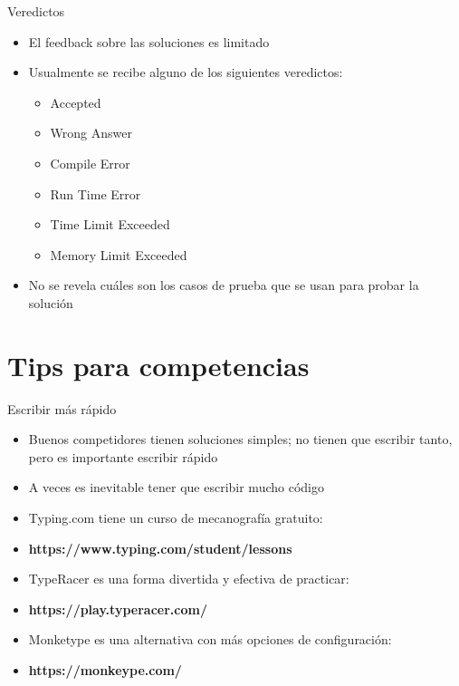 \documentclass[10pt]{beamer}
\newcommand{\bi}{\begin{itemize}}
\newcommand{\ei}{\end{itemize}}
\begin{document}
\begin{frame}{Veredictos}
    \bi
        \item El feedback sobre las soluciones es limitado
        \item Usualmente se recibe alguno de los siguientes veredictos:
            \bi
                \item Accepted
                \item Wrong Answer
                \item Compile Error
                \item Run Time Error
                \item Time Limit Exceeded
                \item Memory Limit Exceeded
            \ei

        \item No se revela cuáles son los casos de prueba que se usan para probar la solución
    \ei
\end{frame}

\section{Tips para competencias}

\begin{frame}{Escribir más rápido}
    \bi
        \item Buenos competidores tienen soluciones simples; no tienen que escribir tanto, pero es importante escribir rápido
        \item A veces es inevitable tener que escribir mucho código
        \vspace{15pt}
        \item Typing.com tiene un curso de mecanografía gratuito:
        \item \textbf{https://www.typing.com/student/lessons}
        \vspace{15pt}
        \item TypeRacer es una forma divertida y efectiva de practicar:
        \item \textbf{https://play.typeracer.com/}
        \vspace{15pt}
        \item Monketype es una alternativa con más opciones de configuración:
        \item \textbf{https://monkeype.com/}
    \ei
\end{frame}
\end{document}
